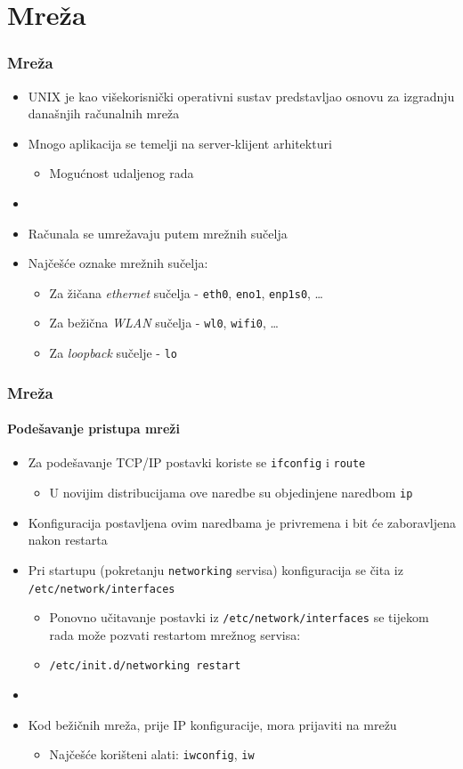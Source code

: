 \documentclass[table,usenames,dvipsnames]{beamer}
\newcommand{\shell}[1]{\texttt{#1}}
\begin{document}
\section{Mreža}
\begin{frame}[t]
	\frametitle{Mreža}
	\begin{itemize}
		\item UNIX je kao višekorisnički operativni sustav predstavljao osnovu za izgradnju današnjih računalnih mreža
		\item Mnogo aplikacija se temelji na server-klijent arhitekturi
		\begin{itemize}
			\item Mogućnost udaljenog rada
		\end{itemize}
		\item[]
		\item Računala se umrežavaju putem mrežnih sučelja
		\item Najčešće oznake mrežnih sučelja:
		\begin{itemize}
			\item Za žičana \emph{ethernet} sučelja - \shell{eth0}, \shell{eno1}, \shell{enp1s0}, \ldots
			\item Za bežična \emph{WLAN} sučelja - \shell{wl0}, \shell{wifi0}, \ldots
			\item Za \emph{loopback} sučelje - \shell{lo}
		\end{itemize}
	\end{itemize}
\end{frame}

\begin{frame}[t]
	\frametitle{Mreža}
	\framesubtitle{Podešavanje pristupa mreži}
	\begin{itemize}
		\item Za podešavanje TCP/IP postavki koriste se \shell{ifconfig} i \shell{route}
		\begin{itemize}
			\item U novijim distribucijama ove naredbe su objedinjene naredbom \shell{ip}
		\end{itemize}
		\item Konfiguracija postavljena ovim naredbama je privremena i bit će zaboravljena nakon restarta
		\item Pri startupu (pokretanju \shell{networking} servisa) konfiguracija se čita iz \shell{/etc/network/interfaces}
		\begin{itemize}
			\item Ponovno učitavanje postavki iz \shell{/etc/network/interfaces} se tijekom rada može pozvati restartom mrežnog servisa:
			\item[] \shell{/etc/init.d/networking restart}
		\end{itemize}
		\item[]
		\item Kod bežičnih mreža, prije IP konfiguracije, mora prijaviti na mrežu
		\begin{itemize}
			\item Najčešće korišteni alati: \shell{iwconfig}, \shell{iw}
		\end{itemize}
	\end{itemize}
\end{frame}
\end{document}
